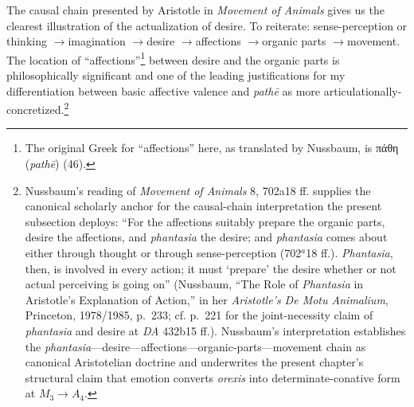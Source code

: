 \documentclass{article}
\newcommand{\gk}[1]{{\greekfont #1}}
\newcommand{\ra}{\ensuremath{\rightarrow}}
\begin{document}
The causal chain presented by Aristotle in \textit{Movement of Animals} gives us the clearest illustration of the actualization of desire. To reiterate: sense-perception or thinking \ra imagination \ra desire \ra affections \ra organic parts \ra movement. The location of ``affections''\footnote{The original Greek for ``affections'' here, as translated by Nussbaum, is \gk{πάθη} (\textit{pathē}) (46).} between desire and the organic parts is philosophically significant and one of the leading justifications for my differentiation between basic affective valence and \textit{pathē} as more articulationally-concretized.\footnote{Nussbaum's reading of \textit{Movement of Animals} 8, 702a18 ff. supplies the canonical scholarly anchor for the causal-chain interpretation the present subsection deploys: ``For the affections suitably prepare the organic parts, desire the affections, and \textit{phantasia} the desire; and \textit{phantasia} comes about either through thought or through sense-perception (702$^{a}$18 ff.). \textit{Phantasia}, then, is involved in every action; it must `prepare' the desire whether or not actual perceiving is going on'' (Nussbaum, ``The Role of \textit{Phantasia} in Aristotle's Explanation of Action,'' in her \textit{Aristotle's De Motu Animalium}, Princeton, 1978/1985, p.~233; cf. p.~221 for the joint-necessity claim of \textit{phantasia} and desire at \textit{DA} 432b15 ff.). Nussbaum's interpretation establishes the \textit{phantasia}---desire---affections---organic-parts---movement chain as canonical Aristotelian doctrine and underwrites the present chapter's structural claim that emotion converts \textit{orexis} into determinate-conative form at $M_3 \rightarrow A_4$.}
\end{document}
